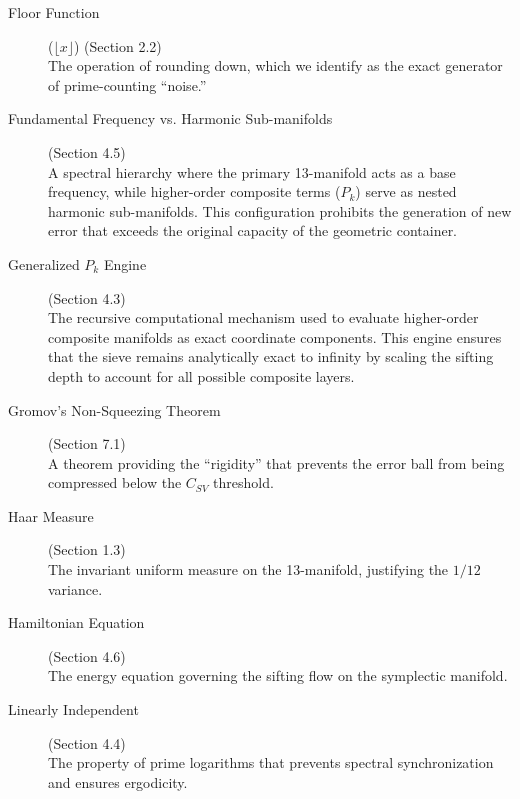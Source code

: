 \documentclass[sn-mathphys-num, pdflatex]{sn-jnl}
\begin{document}
\begin{description}
    \item[Floor Function] \hypertarget{floor_function}{}\label{gloss:floor} ($\lfloor x \rfloor$) (Section 2.2) \hfill \\
    The operation of rounding down, which we identify as the exact generator of prime-counting ``noise.''

    \item[Fundamental Frequency vs. Harmonic Sub-manifolds] \hypertarget{harmonic-hum}{}\label{gloss:harmonic-hum} (Section 4.5) \hfill \\
    A spectral hierarchy where the primary 13-manifold acts as a base frequency, while higher-order composite terms ($P_k$) serve as nested harmonic sub-manifolds. This configuration prohibits the generation of new error that exceeds the original capacity of the geometric container.
    
    \item[Generalized $P_k$ Engine] \hypertarget{pk-engine}{}\label{gloss:pk-engine} (Section 4.3) \hfill \\
    The recursive computational mechanism used to evaluate higher-order composite manifolds as exact coordinate components. This engine ensures that the sieve remains analytically exact to infinity by scaling the sifting depth to account for all possible composite layers.

    \item[Gromov's Non-Squeezing Theorem] \hypertarget{gromov}{}\label{gloss:gromov} (Section 7.1) \hfill \\
    A theorem providing the ``rigidity'' that prevents the error ball from being compressed below the $C_{SV}$ threshold.

    \item[Haar Measure] \hypertarget{haar}{}\label{gloss:haar} (Section 1.3) \hfill \\
    The invariant uniform measure on the 13-manifold, justifying the $1/12$ variance.

    \item[Hamiltonian Equation] \hypertarget{hamiltonian}{}\label{gloss:hamiltonian} (Section 4.6) \hfill \\
    The energy equation governing the sifting flow on the symplectic manifold.

    \item[Linearly Independent] \hypertarget{linear}{}\label{gloss:linear} (Section 4.4) \hfill \\
    The property of prime logarithms that prevents spectral synchronization and ensures ergodicity.


\end{description}
\end{document}
